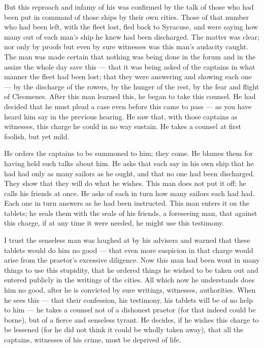 But this reproach and infamy of his was confirmed by the talk of those who had been put in command of those ships by their own cities. Those of that number who had been left, with the fleet lost, fled back to Syracuse, and were saying how many out of each man's ship he knew had been discharged. The matter was clear; nor only by proofs but even by sure witnesses was this man's audacity caught. The man was made certain that nothing was being done in the forum and in the assize the whole day save this --- that it was being asked of the captains in what manner the fleet had been lost; that they were answering and showing each one --- by the discharge of the rowers, by the hunger of the rest, by the fear and flight of Cleomenes. After this man learned this, he began to take this counsel. He had decided that he must plead a case even before this came to pass --- as you have heard him say in the previous hearing. He saw that, with those captains as witnesses, this charge he could in no way sustain. He takes a counsel at first foolish, but yet mild.

 He orders the captains to be summoned to him; they come. He blames them for having held such talks about him. He asks that each say in his own ship that he had had only as many sailors as he ought, and that no one had been discharged. They show that they will do what he wishes. This man does not put it off; he calls his friends at once. He asks of each in turn how many sailors each had had. Each one in turn answers as he had been instructed. This man enters it on the tablets; he seals them with the seals of his friends, a foreseeing man, that against this charge, if at any time it were needed, he might use this testimony.

 I trust the senseless man was laughed at by his advisers and warned that these tablets would do him no good --- that even more suspicion in that charge would arise from the praetor's excessive diligence. Now this man had been wont in many things to use this stupidity, that he ordered things he wished to be taken out and entered publicly in the writings of the cities. All which now he understands does him no good, after he is convicted by sure writings, witnesses, authorities. When he sees this --- that their confession, his testimony, his tablets will be of no help to him --- he takes a counsel not of a dishonest praetor (for that indeed could be borne), but of a fierce and senseless tyrant. He decides, if he wishes this charge to be lessened (for he did not think it could be wholly taken away), that all the captains, witnesses of his crime, must be deprived of life.

